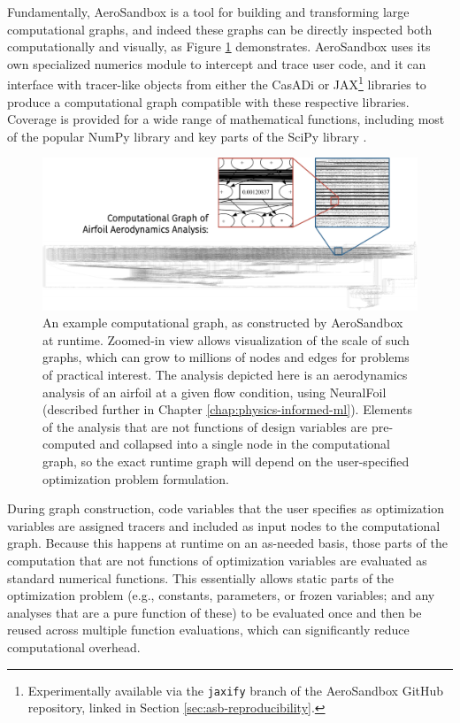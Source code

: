 Fundamentally, AeroSandbox is a tool for building and transforming large computational graphs, and indeed these graphs can be directly inspected both computationally and visually, as Figure \ref{fig:computational-graph-aerosandbox} demonstrates. AeroSandbox uses its own specialized numerics module to intercept and trace user code, and it can interface with tracer-like objects from either the CasADi \cite{casadi} or JAX\footnote{Experimentally available via the \texttt{jaxify} branch of the AeroSandbox GitHub repository, linked in Section \ref{sec:asb-reproducibility}.} \cite{jax} libraries to produce a computational graph compatible with these respective libraries. Coverage is provided for a wide range of mathematical functions, including most of the popular NumPy library \cite{harris_array_2020} and key parts of the SciPy library \cite{scipy}.

\begin{figure}[H]
    \centering
    \includegraphics[width=\textwidth]{../figures/large_computational_graph-crop.pdf}
    \caption{An example computational graph, as constructed by AeroSandbox at runtime. Zoomed-in view allows visualization of the scale of such graphs, which can grow to millions of nodes and edges for problems of practical interest. The analysis depicted here is an aerodynamics analysis of an airfoil at a given flow condition, using NeuralFoil (described further in Chapter \ref{chap:physics-informed-ml}). Elements of the analysis that are not functions of design variables are pre-computed and collapsed into a single node in the computational graph, so the exact runtime graph will depend on the user-specified optimization problem formulation.}
    \label{fig:computational-graph-aerosandbox}
\end{figure}

During graph construction, code variables that the user specifies as optimization variables are assigned tracers and included as input nodes to the computational graph. Because this happens at runtime on an as-needed basis, those parts of the computation that are not functions of optimization variables are evaluated as standard numerical functions. This essentially allows static parts of the optimization problem (e.g., constants, parameters, or frozen variables; and any analyses that are a pure function of these) to be evaluated once and then be reused across multiple function evaluations, which can significantly reduce computational overhead.


